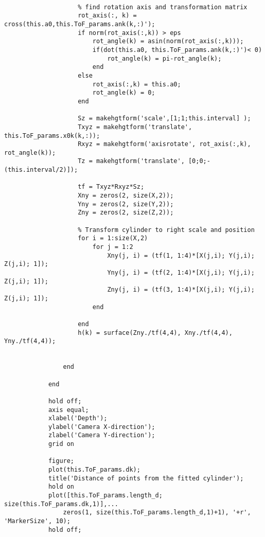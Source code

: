\begin{lstlisting}
                    
                    % find rotation axis and transformation matrix
                    rot_axis(:, k) = cross(this.a0,this.ToF_params.ank(k,:)');
                    if norm(rot_axis(:,k)) > eps
                        rot_angle(k) = asin(norm(rot_axis(:,k)));
                        if(dot(this.a0, this.ToF_params.ank(k,:)')< 0)
                            rot_angle(k) = pi-rot_angle(k);
                        end
                    else
                        rot_axis(:,k) = this.a0;
                        rot_angle(k) = 0;
                    end
                    
                    Sz = makehgtform('scale',[1;1;this.interval] );
                    Txyz = makehgtform('translate', this.ToF_params.x0k(k,:));
                    Rxyz = makehgtform('axisrotate', rot_axis(:,k), rot_angle(k));
                    Tz = makehgtform('translate', [0;0;-(this.interval/2)]);
                    
                    tf = Txyz*Rxyz*Sz;
                    Xny = zeros(2, size(X,2));
                    Yny = zeros(2, size(Y,2));
                    Zny = zeros(2, size(Z,2));
                    
                    % Transform cylinder to right scale and position
                    for i = 1:size(X,2)
                        for j = 1:2
                            Xny(j, i) = (tf(1, 1:4)*[X(j,i); Y(j,i); Z(j,i); 1]);
                            Yny(j, i) = (tf(2, 1:4)*[X(j,i); Y(j,i); Z(j,i); 1]);
                            Zny(j, i) = (tf(3, 1:4)*[X(j,i); Y(j,i); Z(j,i); 1]);
                        end
                        
                    end
                    h(k) = surface(Zny./tf(4,4), Xny./tf(4,4), Yny./tf(4,4));
                    
                    
                end
                
            end
            
            hold off;
            axis equal;
            xlabel('Depth');
            ylabel('Camera X-direction');
            zlabel('Camera Y-direction');
            grid on
            
            figure;
            plot(this.ToF_params.dk);
            title('Distance of points from the fitted cylinder');
            hold on
            plot([this.ToF_params.length_d; size(this.ToF_params.dk,1)],...
                zeros(1, size(this.ToF_params.length_d,1)+1), '+r', 'MarkerSize', 10);
            hold off;
            

\end{lstlisting}
